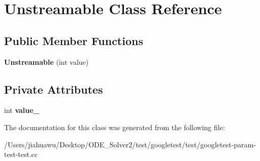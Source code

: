 \hypertarget{class_unstreamable}{}\section{Unstreamable Class Reference}
\label{class_unstreamable}
\subsection*{Public Member Functions}
\begin{DoxyCompactItemize}
\item 
\mbox{\label{class_unstreamable_aec8af0d0f78468a9094f1b36332a0842}} 
{\bfseries Unstreamable} (int value)
\end{DoxyCompactItemize}
\subsection*{Private Attributes}
\begin{DoxyCompactItemize}
\item 
\mbox{\label{class_unstreamable_a3b4a3b4fd9c1999f38b3c63b7de0fa07}} 
int {\bfseries value\+\_\+}
\end{DoxyCompactItemize}


The documentation for this class was generated from the following file\+:\begin{DoxyCompactItemize}
\item 
/\+Users/jiahuawu/\+Desktop/\+O\+D\+E\+\_\+\+Solver2/test/googletest/test/googletest-\/param-\/test-\/test.\+cc\end{DoxyCompactItemize}
